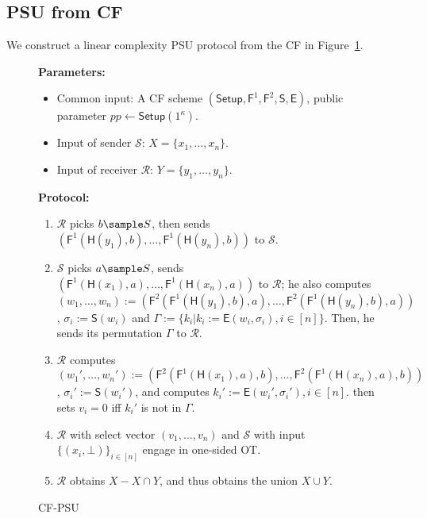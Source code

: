 \subsection{PSU from CF}\label{sec:psu-from-cf}
We construct a linear complexity PSU protocol from the CF in Figure~\ref{fig:CF-PSU}.  
\begin{figure}[!hbtp]
\begin{framed}
\begin{minipage}[center]{\textwidth}
\begin{trivlist}
\item \textbf{Parameters:} 
\begin{itemize}
    \item Common input: A CF scheme $(\mathsf{Setup},\mathsf{F}^1,\mathsf{F}^2,\mathsf{S},\mathsf{E})$, public parameter $pp\leftarrow \mathsf{Setup}(1^\kappa)$.

    \item Input of sender $\mathcal{S}$: $X = \{x_1, \dots, x_n\}$.

    \item Input of receiver $\mathcal{R}$: $Y = \{y_1, \dots, y_n\}$. 
\end{itemize}

\item \textbf{Protocol:}

\begin{enumerate}
\item $\mathcal{R}$ picks $b \sample S$, then sends $(\mathsf{F}^1(\mathsf{H}(y_1),b), \dots, \mathsf{F}^1(\mathsf{H}(y_n),b))$ to $\mathcal{S}$. 

\item $\mathcal{S}$ picks $a \sample S$, 
    sends $(\mathsf{F}^1(\mathsf{H}(x_1),a), \dots, \mathsf{F}^1(\mathsf{H}(x_n),a))$ to $\mathcal{R}$; 
    he also computes $(w_1,\dots,w_n):= (\mathsf{F}^2(\mathsf{F}^1(\mathsf{H}(y_1),b),a), \dots, \mathsf{F}^2(\mathsf{F}^1(\mathsf{H}(y_n),b),a))$, $\sigma_i:=\mathsf{S}(w_i)$ and $\Gamma:= \{k_i| k_i:=\mathsf{E}(w_i,\sigma_i),i\in [n]\}$. Then, he sends its permutation $\Gamma$ to $\mathcal{R}$. 


\item $\mathcal{R}$ computes $(w_1',\dots,w_n'):= (\mathsf{F}^2(\mathsf{F}^1(\mathsf{H}(x_1),a),b), \dots,\mathsf{F}^2(\mathsf{F}^1(\mathsf{H}(x_n),a),b))$, $\sigma_i':=\mathsf{S}(w_i')$, and computes $k_i':=\mathsf{E}(w_i',\sigma_i'), i\in [n]$. 
    then sets $v_i = 0$ iff $k_i'$ is not in $\Gamma$. 

\item $\mathcal{R}$ with select vector $(v_1, \dots, v_n)$ and $\mathcal{S}$ with input $\{(x_i, \bot)\}_{i \in [n]}$ 
    engage in one-sided OT. 

\item $\mathcal{R}$ obtains $X - X \cap Y$, and thus obtains the union $X \cup Y$.  
\end{enumerate}
\end{trivlist}
\end{minipage}
\end{framed}
\caption{CF-PSU}\label{fig:CF-PSU}
\end{figure}










